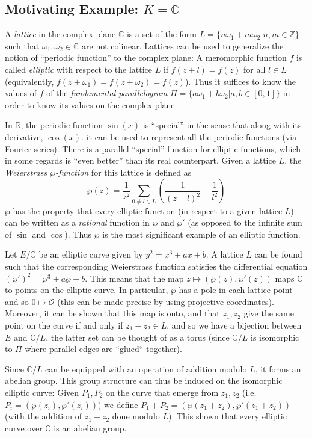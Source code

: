 \documentclass[11pt,english]{article}
\begin{document}
\subsection{Motivating Example: $K=\mathbb{C}$}
A \emph{lattice} in the complex plane $\mathbb{C}$ is a set of the form $L=\{n\omega_1+m\omega_2|n,m\in\mathbb{Z}\}$ such that $\omega_1,\omega_2\in\mathbb{C}$ are
not colinear. Lattices can be used to generalize the notion of ``periodic function'' to the complex plane: A meromorphic function $f$ is called \emph{elliptic} with respect to the lattice
$L$ if $f(z+l)=f(z)$ for all $l\in L$ (equivalently, $f(z+\omega_1)=f(z+\omega_2)=f(z)$). Thus it suffices to know the values of $f$ of the \emph{fundamental parallelogram} $\Pi=\{a\omega_1+b\omega_2|a,b\in[0,1]\}$
in order to know its values on the complex plane.

In $\mathbb{R}$, the periodic function $\sin(x)$ is ``special'' in the sense that along with its derivative, $\cos(x)$. it can be used to represent all
the periodic functions (via Fourier series). There is a parallel ``special'' function for elliptic functions, which in some regards is ``even better'' than its real counterpart. 
Given a lattice $L$, the \emph{Weierstrass $\wp$-function} for this lattice is defined as $$\wp(z)=\frac{1}{z^2}\sum_{0\ne l\in L}\left(\frac{1}{(z-l)^2}-\frac{1}{l^2}\right)$$
$\wp$ has the property that every elliptic function (in respect to a given lattice $L$) can be written as a \emph{rational} function in $\wp$ and $\wp'$ (as opposed to the
infinite sum of $\sin$ and $\cos$). Thus $\wp$ is the most significant example of an elliptic function.

Let $E/\mathbb{C}$ be an elliptic curve given by $y^2=x^3+ax+b$. A lattice $L$ can be found such that the corresponding Weierstrass function satisfies the differential equation
$(\wp')^2=\wp^3+a\wp+b$. This means that the map $z\mapsto (\wp(z),\wp'(z))$ maps $\mathbb{C}$ to points on the elliptic curve. In particular, $\wp$
has a pole in each lattice point and so $0\mapsto \mathcal{O}$ (this can be made precise by using projective coordinates). Moreover, it
can be shown that this map is onto, and that $z_1,z_2$ give the same point on the curve if and only if $z_1-z_2\in L$, and so we have a bijection
between $E$  and $\mathbb{C}/L$, the latter set can be thought of as a torus (since $\mathbb{C}/L$ is isomorphic to $\Pi$ where parallel edges are ``glued`` together).

Since $\mathbb{C}/L$ can be equipped with an operation of addition modulo $L$, it forms an abelian group. This group structure can thus be induced on the 
isomorphic elliptic curve: Given $P_1, P_2$ on the curve that emerge from $z_1,z_2$ (i.e. $P_i=(\wp(z_i),\wp'(z_i))$) we define $P_1+P_2=(\wp(z_1+z_2),\wp'(z_1+z_2))$ 
(with the addition of $z_1+z_2$ done modulo $L$). This shown that every elliptic curve over $\mathbb{C}$ is an abelian group.
\end{document}
